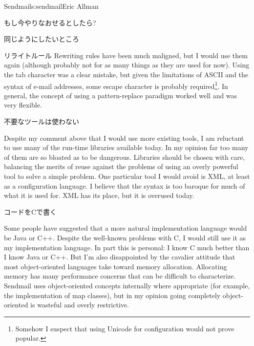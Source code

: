 \begin{aosachapter}{Sendmail}{s:sendmail}{Eric Allman}
\begin{aosasect1}{もし今やりなおせるとしたら?}
\begin{aosasect2}{同じようにしたいところ}
\begin{aosasect3}{リライトルール}
Rewriting rules have been much maligned, but I would use them again
(although probably not for as many things as they are used for now).
Using the tab character was a clear mistake, but given the limitations
of ASCII and the syntax of e-mail addresses, some escape character is
probably required\footnote{Somehow I suspect that using Unicode for
configuration would not prove popular.}. In general, the concept of
using a pattern-replace paradigm worked well and was very flexible.

\end{aosasect3}

\begin{aosasect3}{不要なツールは使わない}

Despite my comment above that I would use more existing tools, I am
reluctant to use many of the run-time libraries available today. In my
opinion far too many of them are so bloated as to be dangerous.
Libraries should be chosen with care, balancing the merits of reuse
against the problems of using an overly powerful tool to solve a
simple problem. One particular tool I would avoid is XML, at least as
a configuration language. I believe that the syntax is too baroque for
much of what it is used for. XML has its place, but it is overused
today.

\end{aosasect3}

\begin{aosasect3}{コードをCで書く}

Some people have suggested that a more natural implementation language
would be Java or C++. Despite the well-known problems with C, I would
still use it as my implementation language. In part this is personal:
I know C much better than I know Java or C++. But I'm also
disappointed by the cavalier attitude that most object-oriented
languages take toward memory allocation. Allocating memory has many
performance concerns that can be difficult to characterize.  Sendmail
uses object-oriented concepts internally where appropriate (for
example, the implementation of map classes), but in my opinion going
completely object-oriented is wasteful and overly restrictive.

\end{aosasect3}

\end{aosasect2}


\end{aosasect1}
\end{aosachapter}
